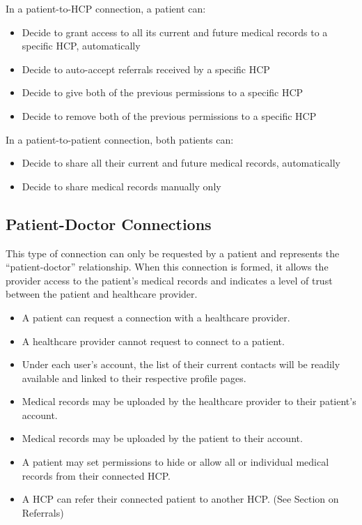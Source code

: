 In a patient-to-HCP connection, a patient can:
\begin{itemize}
\item Decide to grant access to all its current and future medical records to a specific HCP, automatically
\item Decide to auto-accept referrals received by a specific HCP
\item Decide to give both of the previous permissions to a specific HCP
\item Decide to remove both of the previous permissions to a specific HCP
\end{itemize}

In a patient-to-patient connection, both patients can:
\begin{itemize}
\item Decide to share all their current and future medical records, automatically
\item Decide to share medical records manually only 
\end{itemize}

\subsection{Patient-Doctor Connections}
This type of connection can only be requested by a patient and represents the ``patient-doctor'' relationship.  When this connection is formed, it allows the provider access to the patient's medical records and indicates a level of trust between the patient and healthcare provider.
\begin{itemize}
\item A patient can request a connection with a healthcare provider. 
\item A healthcare provider cannot request to connect to a patient. 
\item Under each user's account, the list of their current contacts will be readily available and linked to their respective profile pages.
\item Medical records may be uploaded by the healthcare provider to their patient's account. 
\item Medical records may be uploaded by the patient to their account.
\item A patient may set permissions to hide or allow all or individual medical records from their connected HCP. 
\item A HCP can refer their connected patient to another HCP. (See Section on Referrals)
\end{itemize} 

